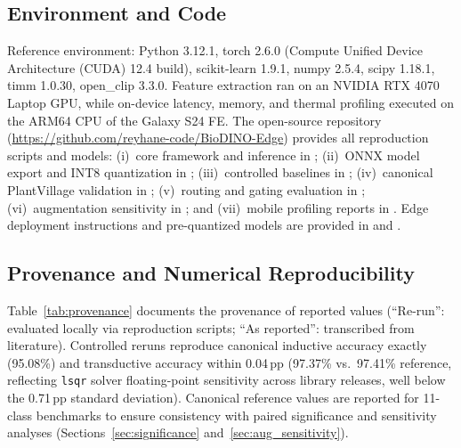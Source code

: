 \subsection{Environment and Code}
Reference environment: Python 3.12.1, torch 2.6.0 (Compute Unified Device Architecture (CUDA) 12.4 build), scikit-learn 1.9.1, numpy 2.5.4, scipy 1.18.1, timm 1.0.30, open\_clip 3.3.0. Feature extraction ran on an NVIDIA RTX 4070 Laptop GPU, while on-device latency, memory, and thermal profiling executed on the ARM64 CPU of the Galaxy S24 FE. The open-source repository (\url{https://github.com/reyhane-code/BioDINO-Edge}) provides all reproduction scripts and models: (i)~core framework and inference in ; (ii)~ONNX model export and INT8 quantization in ; (iii)~controlled baselines in ; (iv)~canonical PlantVillage validation in ; (v)~routing and gating evaluation in ; (vi)~augmentation sensitivity in ; and (vii)~mobile profiling reports in . Edge deployment instructions and pre-quantized models are provided in  and .

\subsection{Provenance and Numerical Reproducibility}
Table~\ref{tab:provenance} documents the provenance of reported values (``Re-run'': evaluated locally via reproduction scripts; ``As reported'': transcribed from literature). Controlled reruns reproduce canonical inductive accuracy exactly (95.08\%) and transductive accuracy within 0.04\,pp (97.37\% vs.\ 97.41\% reference, reflecting \texttt{lsqr} solver floating-point sensitivity across library releases, well below the 0.71\,pp standard deviation). Canonical reference values are reported for 11-class benchmarks to ensure consistency with paired significance and sensitivity analyses (Sections~\ref{sec:significance} and~\ref{sec:aug_sensitivity}).

